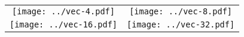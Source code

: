 \documentclass[12pt, a4paper]{report}
\begin{document}
\renewcommand\arraystretch{0}
\renewcommand\tabcolsep{0pt}


\begin{tabular}{cc}
\texttt{[image: ../vec-4.pdf]} &
\texttt{[image: ../vec-8.pdf]} \\
\texttt{[image: ../vec-16.pdf]} &
\texttt{[image: ../vec-32.pdf]} \\
\end{tabular}
\end{document}
